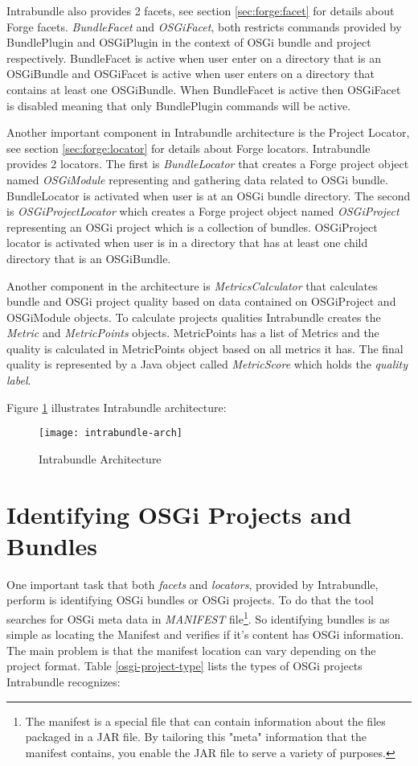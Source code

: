 Intrabundle also provides 2 facets, see section \ref{sec:forge:facet} for details about Forge facets. \emph{BundleFacet} and \emph{OSGiFacet}, both restricts commands provided by BundlePlugin and OSGiPlugin in the context of OSGi bundle and project respectively. BundleFacet is active when user enter on a directory that is an OSGiBundle and OSGiFacet is active when user enters on a directory that contains at least one OSGiBundle. When BundleFacet is active then OSGiFacet is disabled meaning that only BundlePlugin commands will be active. 

Another important component in Intrabundle architecture is the Project Locator, see section \ref{sec:forge:locator} for details about Forge locators. Intrabundle provides 2 locators. The first is \emph{BundleLocator} that creates a Forge project object named \emph{OSGiModule} representing and gathering data related to OSGi bundle. BundleLocator is activated when user is at an OSGi bundle directory. The second is \emph{OSGiProjectLocator} which creates a Forge project object named \emph{OSGiProject} representing an OSGi project which is a collection of bundles. OSGiProject locator is activated when user is in a directory that has at least one child directory that is an OSGiBundle.          

Another component in the architecture is \emph{MetricsCalculator} that calculates bundle and OSGi project quality based on data contained on OSGiProject and OSGiModule objects. To calculate projects qualities Intrabundle creates the \emph{Metric} and \emph{MetricPoints} objects. MetricPoints has a list of Metrics and the quality is calculated in MetricPoints object based on all metrics it has. The final quality is represented by a Java object called \emph{MetricScore} which holds the \emph{quality label}.     

\newpage
Figure \ref{intrabundle-arch} illustrates Intrabundle architecture:

\begin{figure}[h]
\caption{Intrabundle Architecture}
\label{intrabundle-arch}
\centering
\texttt{[image: intrabundle-arch]}
\end{figure}  
\FloatBarrier


\section{Identifying OSGi Projects and Bundles}
One important task that both \emph{facets} and \emph{locators}, provided by Intrabundle, perform is identifying OSGi bundles or OSGi projects. To do that the tool searches for OSGi meta data in \emph{MANIFEST} file\footnote{The manifest is a special file that can contain information about the files packaged in a JAR file. By tailoring this "meta" information that the manifest contains, you enable the JAR file to serve a variety of purposes.}. So identifying bundles is as simple as locating the Manifest and verifies if it's content has OSGi information. The main problem is that the manifest location can vary depending on the project format. Table \ref{osgi-project-type} lists the types of OSGi projects Intrabundle recognizes:     


